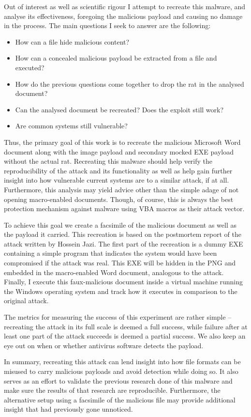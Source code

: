 Out of interest as well as scientific rigour I attempt to recreate this malware, and analyse its effectiveness,
foregoing the malicious payload and causing no damage in the process. The main questions I seek to answer are the following:
\begin{itemize}
  \item How can a file hide malicious content?
  \item How can a concealed malicious payload be extracted from a file and executed?
  \item How do the previous questions come together to drop the \acrfull{rat} in the analysed document?
  \item Can the analysed document be recreated? Does the exploit still work?
  \item Are common systems still vulnerable?
\end{itemize}

Thus, the primary goal of this work is to recreate the malicious Microsoft Word document along with the image
payload and secondary mocked \acrfull{EXE} payload without the actual \acrlong{rat}. Recreating this malware should help
verify the reproducibility of the attack and its functionality as well as help gain further
insight into how vulnerable current systems are to a similar attack, if at all. Furthermore, this analysis may yield
advice other than the simple adage of not opening macro-enabled documents. Though, of course, this is always the best
protection mechanism against malware using \acrshort{VBA} macros as their attack vector.

To achieve this goal we create a facsimile of the malicious document as well as the payload it carried.
This recreation is based on the postmortem report of the attack written by Hossein Jazi. 
The first part of the recreation is a dummy \acrlong{EXE} containing a simple program that indicates the 
system would have been compromised if the attack was real. This \acrshort{EXE} will be hidden in the \acrshort{PNG}
and embedded in the macro-enabled Word document, analogous to the attack.
Finally, I execute this faux-malicious document inside a virtual machine running the Windows operating system
and track how it executes in comparison to the original attack. 

The metrics for measuring the success of this experiment are rather simple -- recreating the attack in its full
scale is deemed a full success, while failure after at least one part of the attack succeeds is deemed a partial
success. We also keep an eye out on when or whether antivirus software detects the payload.

In summary, recreating this attack can lend insight into how file formats can be misused to carry malicious payloads and
avoid detection while doing so. It also serves as an effort to validate the previous research done of this malware and
make sure the results of that research are reproducible. Furthermore, the alternative setup using a facsimile of the
malicious file may provide additional insight that had previously gone unnoticed.

\clearpage

